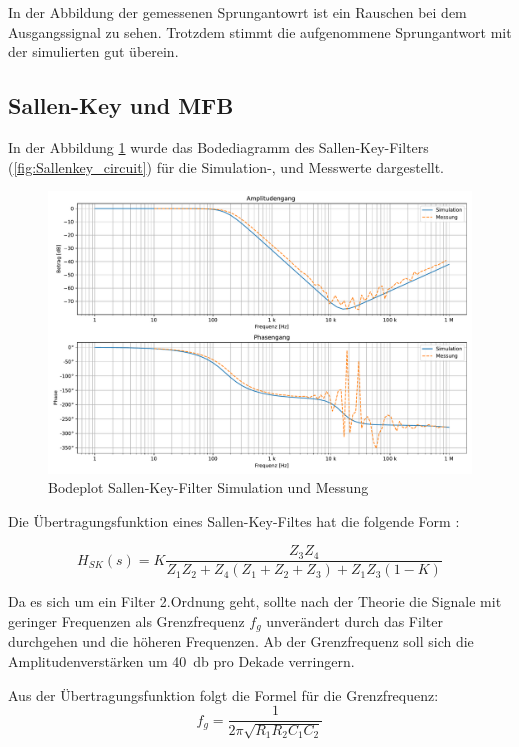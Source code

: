 In der Abbildung der gemessenen Sprungantowrt ist  ein Rauschen bei dem Ausgangssignal zu sehen. Trotzdem stimmt die aufgenommene Sprungantwort mit der simulierten gut überein.



%
\subsection{Sallen-Key und MFB}
In der Abbildung \ref{fig:SallenKey_Bode} wurde das Bodediagramm des Sallen-Key-Filters (\ref{fig:Sallenkey_circuit}) für die Simulation-, und Messwerte dargestellt.

\begin{figure}[H]
 \centering
 \includegraphics[width=0.7\linewidth]{Elektronik-Laborprotokoll_Filter/Plots/SallenKey_Bodediagramm_Simulation_mit_Messung.pdf}
 \caption{ Bodeplot Sallen-Key-Filter Simulation und  Messung}
 \label{fig:SallenKey_Bode}
\end{figure}

Die Übertragungsfunktion eines Sallen-Key-Filtes hat die folgende Form \cite{Skript}:

\begin{equation}
  H_{SK}(s) = K\frac{ Z_3Z_4}{Z_1Z_2 + Z_4(Z_1 + Z_2 + Z_3) + Z_1Z_3(1 - K)}
\end{equation}

Da es sich um ein Filter 2.Ordnung geht, sollte nach der Theorie die Signale mit geringer Frequenzen als Grenzfrequenz $f_g$ unverändert durch das Filter durchgehen und die höheren Frequenzen. Ab der Grenzfrequenz soll sich die Amplitudenverstärken um \SI{40}{\decibel} pro Dekade verringern.

Aus der Übertragungsfunktion folgt die Formel für die Grenzfrequenz:
\begin{equation}
f_g = \frac{1}{2\pi \sqrt{R_1R_2C_1C_2}}
\end{equation}

